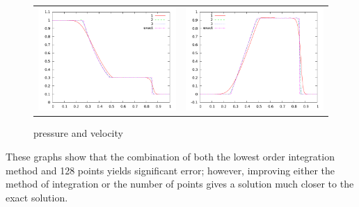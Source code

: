 \documentclass[letterpaper,12pt]{article}
\begin{document}
\begin{figure}
  \begin{center}
	\begin{tabular}{cc}
      \includegraphics[width=.425\textwidth]{prs128comp_20} &
	  \includegraphics[width=.425\textwidth]{vel128comp_20}
	\end{tabular}
  \end{center}
  \caption{pressure and velocity}
\end{figure}


These graphs show that the combination of both the lowest order integration method and 128 points yields significant error; however, improving either the method of integration or the number of points gives a solution much closer to the exact solution. 

\clearpage
\end{document}
